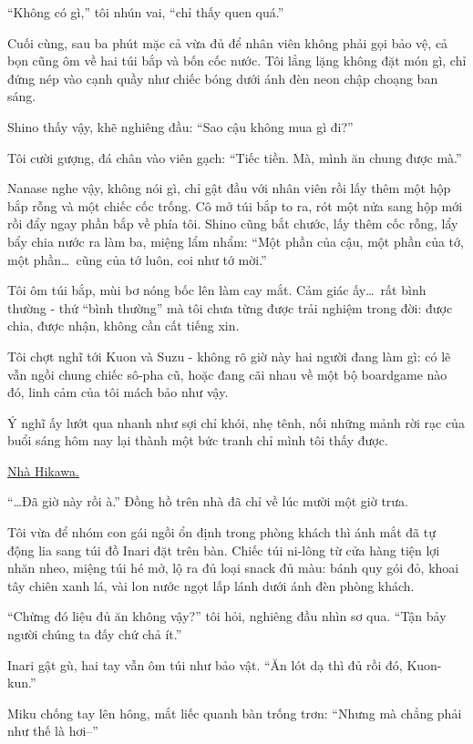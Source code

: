 \documentclass[../main.tex]{subfiles}
\begin{document}
``Không có gì,'' tôi nhún vai, ``chỉ thấy quen quá.''

Cuối cùng, sau ba phút mặc cả vừa đủ để nhân viên không phải gọi bảo vệ, cả bọn cũng ôm về hai túi bắp và bốn cốc nước. Tôi lẳng lặng không đặt món gì, chỉ đứng nép vào cạnh quầy như chiếc bóng dưới ánh đèn neon chập choạng ban sáng.

Shino thấy vậy, khẽ nghiêng đầu: ``Sao cậu không mua gì đi?''

Tôi cười gượng, đá chân vào viên gạch: ``Tiếc tiền. Mà, mình ăn chung được mà.''

Nanase nghe vậy, không nói gì, chỉ gật đầu với nhân viên rồi lấy thêm một hộp bắp rỗng và một chiếc cốc trống. Cô mở túi bắp to ra, rót một nửa sang hộp mới rồi đẩy ngay phần bắp về phía tôi. Shino cũng bắt chước, lấy thêm cốc rỗng, lẩy bẩy chia nước ra làm ba, miệng lẩm nhẩm: ``Một phần của cậu, một phần của tớ, một phần\dots\ cũng của tớ luôn, coi như tớ mời.''

Tôi ôm túi bắp, mùi bơ nóng bốc lên làm cay mắt. Cảm giác ấy\dots\ rất bình thường - thứ ``bình thường'' mà tôi chưa từng được trải nghiệm trong đời: được chia, được nhận, không cần cất tiếng xin.

Tôi chợt nghĩ tới Kuon và Suzu -  không rõ giờ này hai người đang làm gì: có lẽ vẫn ngồi chung chiếc sô-pha cũ, hoặc đang cãi nhau về một bộ boardgame nào đó, linh cảm của tôi mách bảo như vậy.

Ý nghĩ ấy lướt qua nhanh như sợi chỉ khói, nhẹ tênh, nối những mảnh rời rạc của buổi sáng hôm nay lại thành một bức tranh chỉ mình tôi thấy được.

\begin{center}
  \uline{Nhà Hikawa.}
\end{center}

``\dots Đã giờ này rồi à.'' Đồng hồ trên nhà đã chỉ về lúc mười một giờ trưa.

Tôi vừa để nhóm con gái ngồi ổn định trong phòng khách thì ánh mắt đã tự động lia sang túi đồ Inari đặt trên bàn. Chiếc túi ni-lông từ cửa hàng tiện lợi nhăn nheo, miệng túi hé mở, lộ ra đủ loại snack đủ màu: bánh quy gói đỏ, khoai tây chiên xanh lá, vài lon nước ngọt lấp lánh dưới ánh đèn phòng khách.

``Chừng đó liệu đủ ăn không vậy?'' tôi hỏi, nghiêng đầu nhìn sơ qua. ``Tận bảy người chúng ta đấy chứ chả ít.''

Inari gật gù, hai tay vẫn ôm túi như bảo vật. ``Ăn lót dạ thì đủ rồi đó, Kuon-kun.''

Miku chống tay lên hông, mắt liếc quanh bàn trống trơn: ``Nhưng mà chẳng phải như thế là hơi--''
\end{document}
